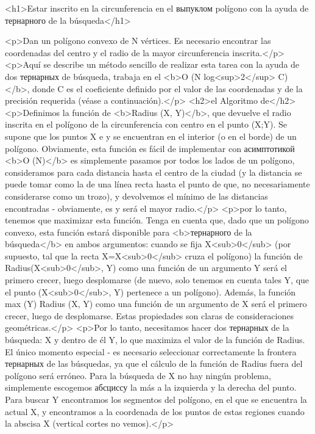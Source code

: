 <h1>Estar inscrito en la circunferencia en el выпуклом polígono con la ayuda de тернарного de la búsqueda</h1>

<p>Dan un polígono convexo de N vértices. Es necesario encontrar las coordenadas del centro y el radio de la mayor circunferencia inscrita.</p>
<p>Aquí se describe un método sencillo de realizar esta tarea con la ayuda de dos тернарных de búsqueda, trabaja en el <b>O (N log<sup>2</sup> C)</b>, donde C es el coeficiente definido por el valor de las coordenadas y de la precisión requerida (véase a continuación).</p>
<h2>el Algoritmo de</h2>
<p>Definimos la función de <b>Radius (X, Y)</b>, que devuelve el radio inscrita en el polígono de la circunferencia con centro en el punto (X;Y). Se supone que los puntos X e y se encuentran en el interior (o en el borde) de un polígono. Obviamente, esta función es fácil de implementar con асимптотикой <b>O (N)</b> es simplemente pasamos por todos los lados de un polígono, consideramos para cada distancia hasta el centro de la ciudad (y la distancia se puede tomar como la de una línea recta hasta el punto de que, no necesariamente considerarse como un trozo), y devolvemos el mínimo de las distancias encontradas - obviamente, es y será el mayor radio.</p>
<p>por lo tanto, tenemos que maximizar esta función. Tenga en cuenta que, dado que un polígono convexo, esta función estará disponible para <b>тернарного de la búsqueda</b> en ambos argumentos: cuando se fija X<sub>0</sub> (por supuesto, tal que la recta X=X<sub>0</sub> cruza el polígono) la función de Radius(X<sub>0</sub>, Y) como una función de un argumento Y será el primero crecer, luego desplomarse (de nuevo, solo tenemos en cuenta tales Y, que el punto (X<sub>0</sub>, Y) pertenece a un polígono). Además, la función max (Y) { Radius (X, Y) } como una función de un argumento de X será el primero crecer, luego de desplomarse. Estas propiedades son claras de consideraciones geométricas.</p>
<p>Por lo tanto, necesitamos hacer dos тернарных de la búsqueda: X y dentro de él Y, lo que maximiza el valor de la función de Radius. El único momento especial - es necesario seleccionar correctamente la frontera тернарных de las búsquedas, ya que el cálculo de la función de Radius fuera del polígono será erróneo. Para la búsqueda de X no hay ningún problema, simplemente escogemos абсциссу la más a la izquierda y la derecha del punto. Para buscar Y encontramos los segmentos del polígono, en el que se encuentra la actual X, y encontramos a la coordenada de los puntos de estas regiones cuando la abscisa X (vertical cortes no vemos).</p>
